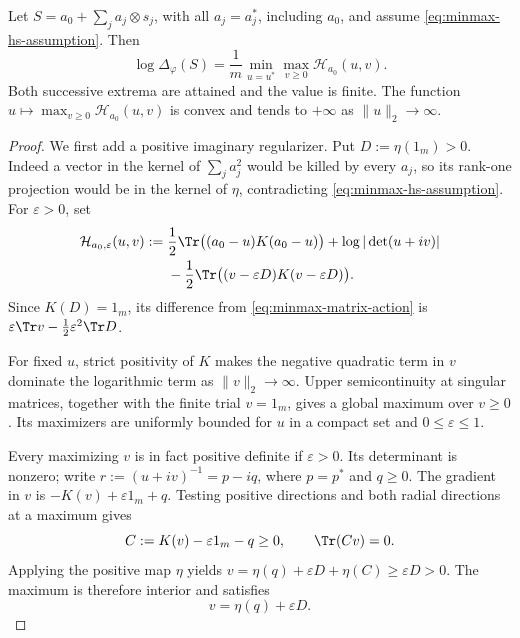 \begin{theorem}\label{prop:minmax-matrix}
Let $S=a_0+\sum_j a_j\otimes s_j$, with all $a_j=a_j^*$, including $a_0$, and assume \eqref{eq:minmax-hs-assumption}.
Then
\begin{equation}\label{eq:minmax-matrix}
 \log\Delta_\varphi(S)
 =\frac1m\min_{u=u^*}\max_{v\ge0}\mathcal H_{a_0}(u,v).
\end{equation}
Both successive extrema are attained and the value is finite.
The function $u\mapsto\max_{v\ge0}\mathcal H_{a_0}(u,v)$ is convex and tends to $+\infty$ as $\|u\|_2\to\infty$.
\end{theorem}

\begin{proof}
We first add a positive imaginary regularizer.
Put $D:=\eta(1_m)>0$.
Indeed a vector in the kernel of $\sum_j a_j^2$ would be killed by every $a_j$, so its rank-one projection would be in the kernel of $\eta$, contradicting \eqref{eq:minmax-hs-assumption}.
For $\varepsilon>0$, set
\begin{equation}\label{eq:minmax-matrix-regularized}
\begin{split}
 \mathcal H_{a_0,\varepsilon}(u,v)
 :={}&\frac12\Tr\bigl((a_0-u)K(a_0-u)\bigr)
 +\log|\det(u+iv)|\\
 &-\frac12\Tr\bigl((v-\varepsilon D)K(v-\varepsilon D)\bigr).
\end{split}
\end{equation}
Since $K(D)=1_m$, its difference from \eqref{eq:minmax-matrix-action} is $\varepsilon\Tr v-\frac12\varepsilon^2\Tr D$.

For fixed $u$, strict positivity of $K$ makes the negative quadratic term in $v$ dominate the logarithmic term as $\|v\|_2\to\infty$.
Upper semicontinuity at singular matrices, together with the finite trial $v=1_m$, gives a global maximum over $v\ge0$.
Its maximizers are uniformly bounded for $u$ in a compact set and $0\le\varepsilon\le1$.

Every maximizing $v$ is in fact positive definite if $\varepsilon>0$.
Its determinant is nonzero; write $r:=(u+iv)^{-1}=p-iq$, where $p=p^*$ and $q\ge0$.
The gradient in $v$ is $-K(v)+\varepsilon1_m+q$.
Testing positive directions and both radial directions at a maximum gives
\[
 C:=K(v)-\varepsilon1_m-q\ge0,
 \qquad \Tr(Cv)=0.
\]
Applying the positive map $\eta$ yields $v=\eta(q)+\varepsilon D+\eta(C)\ge\varepsilon D>0$.
The maximum is therefore interior and satisfies
\begin{equation}\label{eq:minmax-matrix-inner}
 v=\eta(q)+\varepsilon D.
\end{equation}


\end{proof}
